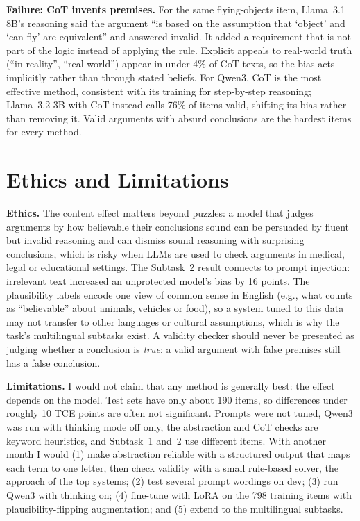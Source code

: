 \documentclass[11pt,letterpaper]{article}
\begin{document}
\textbf{Failure: CoT invents premises.} For the same flying-objects item, Llama~3.1 8B's reasoning said the argument ``is based on the assumption that `object' and `can fly' are equivalent'' and answered invalid. It added a requirement that is not part of the logic instead of applying the rule. Explicit appeals to real-world truth (``in reality'', ``real world'') appear in under 4\% of CoT texts, so the bias acts implicitly rather than through stated beliefs. For Qwen3, CoT is the most effective method, consistent with its training for step-by-step reasoning; Llama~3.2 3B with CoT instead calls 76\% of items valid, shifting its bias rather than removing it. Valid arguments with absurd conclusions are the hardest items for every method.

\section{Ethics and Limitations}
\textbf{Ethics.} The content effect matters beyond puzzles: a model that judges arguments by how believable their conclusions sound can be persuaded by fluent but invalid reasoning and can dismiss sound reasoning with surprising conclusions, which is risky when LLMs are used to check arguments in medical, legal or educational settings. The Subtask~2 result connects to prompt injection: irrelevant text increased an unprotected model's bias by 16 points. The plausibility labels encode one view of common sense in English (e.g., what counts as ``believable'' about animals, vehicles or food), so a system tuned to this data may not transfer to other languages or cultural assumptions, which is why the task's multilingual subtasks exist. A validity checker should never be presented as judging whether a conclusion is \emph{true}: a valid argument with false premises still has a false conclusion.

\textbf{Limitations.} I would not claim that any method is generally best: the effect depends on the model. Test sets have only about 190 items, so differences under roughly 10 TCE points are often not significant. Prompts were not tuned, Qwen3 was run with thinking mode off only, the abstraction and CoT checks are keyword heuristics, and Subtask~1 and~2 use different items. With another month I would (1) make abstraction reliable with a structured output that maps each term to one letter, then check validity with a small rule-based solver, the approach of the top systems; (2) test several prompt wordings on dev; (3) run Qwen3 with thinking on; (4) fine-tune with LoRA on the 798 training items with plausibility-flipping augmentation; and (5) extend to the multilingual subtasks.
\end{document}

